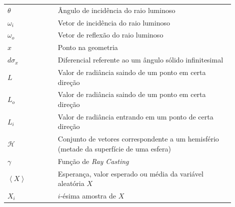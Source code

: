 

\begin{listasimb}

\begin{longtable}[l]{p{0.2\linewidth}p{0.7\linewidth}}
$\theta$ & Ângulo de incidência do raio luminoso\\
$\omega_i$ & Vetor de incidência do raio luminoso\\
$\omega_o$ & Vetor de reflexão do raio luminoso\\
$x$ & Ponto na geometria\\
$d\sigma_x$ & Diferencial referente ao um ângulo sólido infinitesimal\\
$L$ & Valor de radiância saindo de um ponto em certa direção\\
$L_o$ & Valor de radiância saindo de um ponto em certa direção\\
$L_i$ & Valor de radiância entrando em um ponto de certa direção\\
  $\mathcal{H}$ & Conjunto de vetores correspondente a um hemisfério (metade da superfície de uma esfera)\\
$\gamma$ & Função de \emph{Ray Casting}\\
$\left\langle X \right\rangle$ & Esperança, valor esperado ou média da variável aleatória $X$\\
$X_i$ & $i$-ésima amostra de $X$\\

\end{longtable}

\end{listasimb}

